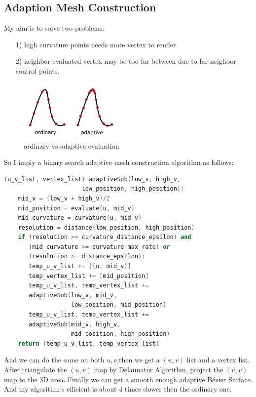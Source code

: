 \documentclass[acmtog]{acmart}
\begin{document}
\subsection{Adaption Mesh Construction}
My aim is to solve two problems:
\begin{itemize}
    \item [1)] high curvature points needs more vertex to render
    \item [2)] neighbor evaluated vertex may be too far between due to far neighbor control points.
\end{itemize}

\begin{figure}[h]
    \centering
    \includegraphics[height = 3.0cm]{ordinary_vs_adaptive.png}
    \caption{ordinary vs adaptive evaluation}
\end{figure}
So I imply a binary search adaptive mesh construction algorithm as follows:
\begin{lstlisting}[language=C++]
(u_v_list, vertex_list) adaptiveSub(low_v, high_v,
                      low_position, high_position):
    mid_v = (low_v + high_v)/2
    mid_position = evaluate(u, mid_v)
    mid_curvature = curvature(u, mid_v)
    resolution = distance(low_position, high_position)
    if (resolution >= curvature_distance_epsilon) and
       (mid_curvature >= curvature_max_rate) or
       (resolution >= distance_epsilon):
       temp_u_v_list += [(u, mid_v)]
       temp_vertex_list += [mid_position]
       temp_u_v_list, temp_vertex_list +=
       adaptiveSub(low_v, mid_v,
                   low_position, mid_position)
       temp_u_v_list, temp_vertex_list +=
       adaptiveSub(mid_v, high_v,
                   mid_position, high_position)
    return (temp_u_v_list, temp_vertex_list)
\end{lstlisting}
And we can do the same on both $u, v$,then we get a $(u,v)$ list and a vertex list.
After triangulate the $(u,v)$ map by Delaunator Algorithm, project the $(u,v)$ map to the 3D area.
Finally we can get a smooth enough adaptive Bézier Surface. And my algorithm's efficient is about 4 times slower then the ordinary one.
\end{document}
